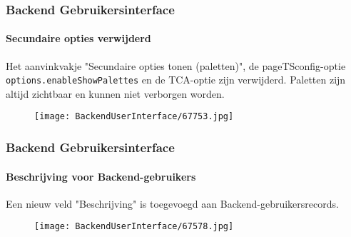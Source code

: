 \begin{frame}[fragile]
	\frametitle{Backend Gebruikersinterface}
	\framesubtitle{Secundaire opties verwijderd}

	Het aanvinkvakje "Secundaire opties tonen (paletten)", de pageTSconfig-optie \texttt{options.enableShowPalettes}
	en de TCA-optie zijn verwijderd. Paletten zijn altijd zichtbaar en kunnen niet verborgen worden.

	\begin{figure}
		\texttt{[image: BackendUserInterface/67753.jpg]}
	\end{figure}

\end{frame}

\begin{frame}[fragile]
	\frametitle{Backend Gebruikersinterface}
	\framesubtitle{Beschrijving voor Backend-gebruikers}

	Een nieuw veld "Beschrijving" is toegevoegd aan Backend-gebruikersrecords.

	\begin{figure}
		\texttt{[image: BackendUserInterface/67578.jpg]}
	\end{figure}

\end{frame}

